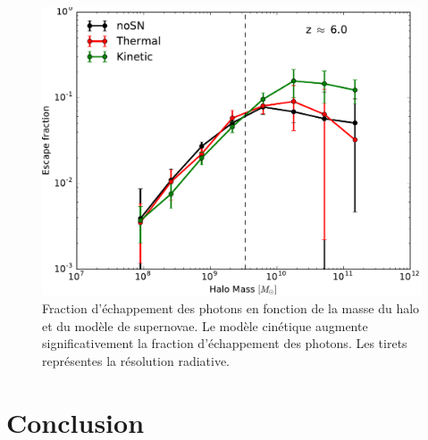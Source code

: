 \begin{figure}
	\centering
	\includegraphics[width=.95\linewidth]{img/03/fesc.pdf} 
    \caption[Fraction d'échappement des photons]{Fraction d'échappement des photons en fonction de la masse du halo et du modèle de supernovae.
    Le modèle cinétique augmente significativement la fraction d'échappement des photons.
    Les tirets représentes la résolution radiative.
 	\label{fig:fesc}}
\end{figure}


\section{Conclusion}

